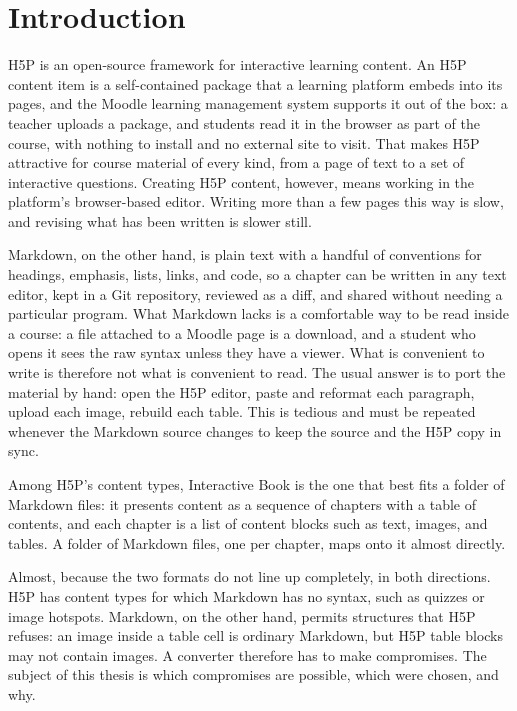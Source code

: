 \section{Introduction}
\label{sec:introduction}

H5P is an open-source framework for interactive learning content.
An H5P content item is a
self-contained package that a learning platform embeds into its pages, and the Moodle learning
management system supports it out of the box: a teacher uploads a package, and students read it in
the browser as part of the course, with nothing to install and no external site to visit.
That
makes H5P attractive for course material of every kind, from a page of text to a set of
interactive questions.
Creating H5P content, however, means working in the platform's browser-based
editor.
Writing more than a few pages this way is slow, and
revising what has been written is slower still.

Markdown, on the other hand, is plain text with a handful of conventions for headings,
emphasis, lists, links, and code, so a chapter can be written in any text editor, kept in a Git
repository, reviewed as a diff, and shared without needing a particular program.
What Markdown lacks is a comfortable way to be read inside a course: a  file attached to a Moodle page
is a download, and a student who opens it sees the raw syntax unless they have a viewer.
What is convenient to write is therefore not what is convenient to read.
The usual answer is to port the material by hand: open the H5P editor, paste and reformat each paragraph, upload
each image, rebuild each table.
This is tedious and must be repeated whenever the Markdown source changes to keep the source and the H5P copy in sync.

Among H5P's content types, Interactive Book is the one that best fits
a folder of Markdown files: it presents content as a sequence of chapters with a table of
contents, and each chapter is a list of content blocks such as text, images, and tables.
A folder
of Markdown files, one per chapter, maps onto it almost directly.

Almost, because the two formats do not line up completely, in both directions.
H5P has content
types for which Markdown has no syntax, such as quizzes or image hotspots.
Markdown, on the other
hand, permits structures that H5P refuses: an image inside a table cell is ordinary Markdown, but H5P table blocks may not contain images.
A converter therefore has to make compromises. The subject of this thesis is
which compromises are possible, which were chosen, and why.

